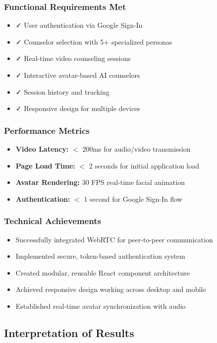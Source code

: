 \documentclass[11pt,a4paper]{article}
\begin{document}
\subsubsection{Functional Requirements Met}
\begin{itemize}
    \item ✓ User authentication via Google Sign-In
    \item ✓ Counselor selection with 5+ specialized personas
    \item ✓ Real-time video counseling sessions
    \item ✓ Interactive avatar-based AI counselors
    \item ✓ Session history and tracking
    \item ✓ Responsive design for multiple devices
\end{itemize}

\subsubsection{Performance Metrics}
\begin{itemize}
    \item \textbf{Video Latency:} $<$ 200ms for audio/video transmission
    \item \textbf{Page Load Time:} $<$ 2 seconds for initial application load
    \item \textbf{Avatar Rendering:} 30 FPS real-time facial animation
    \item \textbf{Authentication:} $<$ 1 second for Google Sign-In flow
\end{itemize}

\subsubsection{Technical Achievements}
\begin{itemize}
    \item Successfully integrated WebRTC for peer-to-peer communication
    \item Implemented secure, token-based authentication system
    \item Created modular, reusable React component architecture
    \item Achieved responsive design working across desktop and mobile
    \item Established real-time avatar synchronization with audio
\end{itemize}

\subsection{Interpretation of Results}
\end{document}
